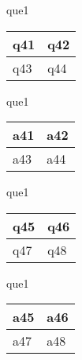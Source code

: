 \documentclass[13.5pt, varwidth=true]{beamer}
\begin{document}
\begin{frame}[shrink=19,fragile]
	\begin{beamercolorbox}[rounded=true, left, shadow=true,wd=14.8cm]{que1}
		\begin{tabular}{p{7cm} | p{7cm}}
			\parbox{7cm}{q41 } & \parbox{7cm}{q42 } \\ 
			\hline
			\parbox{7cm}{q43 } & \parbox{7cm}{q44 } \\
		\end{tabular}
	\end{beamercolorbox}
\end{frame}
\begin{frame}[shrink=19,fragile]
	\begin{beamercolorbox}[rounded=true, left, shadow=true,wd=14.8cm]{que1}
		\begin{tabular}{p{7cm} | p{7cm}}
			\textcolor{ared}{a41 }  & \textcolor{ared}{a42 } \\ 
			\hline
			\textcolor{ared}{a43 }  & \textcolor{ared}{a44 } \\
		\end{tabular}
	\end{beamercolorbox}
\end{frame}

\begin{frame}[shrink=19,fragile]
	\begin{beamercolorbox}[rounded=true, left, shadow=true,wd=14.8cm]{que1}
		\begin{tabular}{p{7cm} | p{7cm}}
			\parbox{7cm}{q45 } & \parbox{7cm}{q46 } \\ 
			\hline
			\parbox{7cm}{q47 } & \parbox{7cm}{q48 } \\
		\end{tabular}
	\end{beamercolorbox}
\end{frame}
\begin{frame}[shrink=19,fragile]
	\begin{beamercolorbox}[rounded=true, left, shadow=true,wd=14.8cm]{que1}
		\begin{tabular}{p{7cm} | p{7cm}}
			\textcolor{ared}{a45 }  & \textcolor{ared}{a46 } \\ 
			\hline
			\textcolor{ared}{a47 }  & \textcolor{ared}{a48 } \\
		\end{tabular}
	\end{beamercolorbox}
\end{frame}
\end{document}
